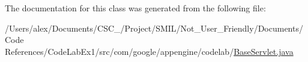 The documentation for this class was generated from the following file\-:\begin{DoxyCompactItemize}
\item 
/\-Users/alex/\-Documents/\-C\-S\-C\-\_/\-Project/\-S\-M\-I\-L/\-Not\-\_\-\-User\-\_\-\-Friendly/\-Documents/\-Code References/\-Code\-Lab\-Ex1/src/com/google/appengine/codelab/\hyperlink{_base_servlet_8java}{Base\-Servlet.\-java}\end{DoxyCompactItemize}
